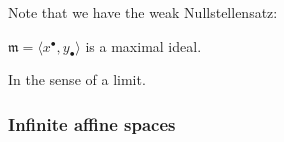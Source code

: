     


    

    
    \iffalse    
    Note that we have the weak Nullstellensatz:
    \begin{lem}
    \(\mathfrak{m}=\langle x^{\bullet}, y_{\bullet} \rangle\) is a maximal ideal.
    \end{lem}
    In the sense of a limit.
    
    
    
    
    
   
   
   
    \subsubsection{Infinite affine spaces}
    
